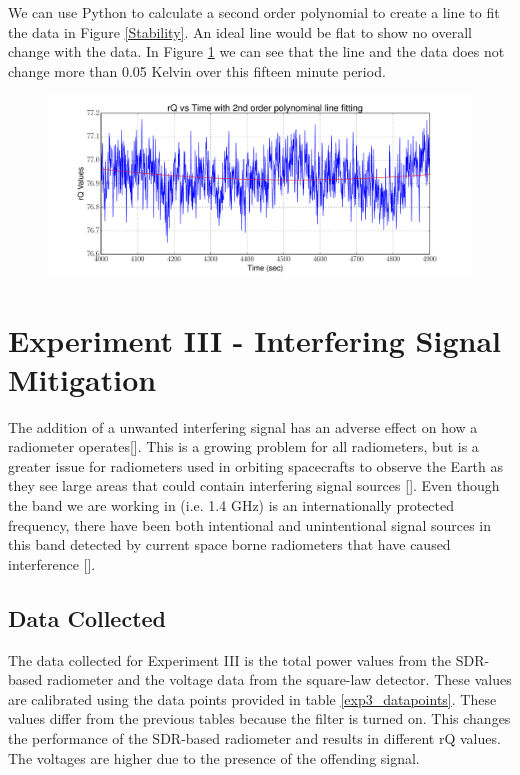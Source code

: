 {We can use Python to calculate a second order polynomial to create a line to fit the data in Figure \ref{Stability}.  An ideal line would be flat to show no overall change with the data.  In Figure \ref{Stability_calib} we can see that the line and the data does not change more than 0.05 Kelvin over this fifteen minute period.

\begin{figure}[h!tb] \centering
\includegraphics[width=\textwidth]{Experiments/Exp2/calib_line_fitting.pdf}
\label{Stability_calib}
\end{figure}

\section{Experiment III - Interfering Signal Mitigation} \label{Exp3_results}

The addition of a unwanted interfering signal has an adverse effect on how a radiometer operates[\cite{Ellingson}].  This is a growing problem for all radiometers, but is a greater issue for radiometers used in orbiting spacecrafts to observe the Earth as they see large areas that could contain interfering signal sources [\cite{DeRooRFI}].  Even though the band we are working in (i.e. 1.4 GHz) is an internationally protected frequency, there have been both intentional and unintentional signal sources in this band detected by current space borne radiometers that have caused interference [\cite{Forte}].

\subsection{Data Collected}

The data collected for Experiment III is the total power values from the SDR-based radiometer and the voltage data from the square-law detector.  These values are calibrated using the data points provided in table \ref{exp3_datapoints}.  These values differ from the previous tables because the filter is turned on.  This changes the performance of the SDR-based radiometer and results in different rQ values.  The voltages are higher due to the presence of the offending signal.

}
